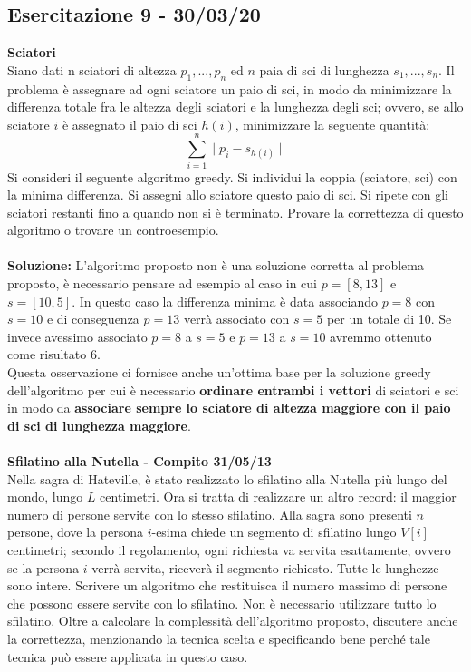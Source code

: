 \documentclass[../cheatSheetAlgoritmi.tex]{subfiles}
\begin{document}
\subsection{Esercitazione 9 - 30/03/20}
\textbf{Sciatori}\\
Siano dati n sciatori di altezza $p_{1}, ..., p_{n}$ ed $n$ paia di sci di lunghezza $s_{1}, ..., s_{n}$. Il problema è assegnare ad ogni sciatore un paio di sci, in modo da minimizzare la differenza totale fra le altezza degli sciatori e la lunghezza degli sci; ovvero, se allo sciatore $i$ è assegnato il paio di sci $h(i)$, minimizzare la seguente quantità:\\
\begin{equation}
	\sum_{i = 1}^{n}\mid{p_{i} - s_{h(i)}}\mid
\end{equation}
Si consideri il seguente algoritmo greedy. Si individui la coppia (sciatore, sci) con la minima differenza. Si assegni allo sciatore questo paio di sci. Si ripete con gli sciatori restanti fino a quando non si è terminato. Provare la correttezza di questo algoritmo o trovare un controesempio.\\\\
\textbf{Soluzione:} L'algoritmo proposto non è una soluzione corretta al problema proposto, è necessario pensare ad esempio al caso in cui $p = [8, 13]$ e $s = [10, 5]$. In questo caso la differenza minima è data associando $p = 8$ con $s = 10$ e di conseguenza $p = 13$ verrà associato con $s = 5$ per un totale di 10. Se invece avessimo associato $p = 8$ a $s = 5$ e $p = 13$ a $s = 10$ avremmo ottenuto come risultato 6.\\
Questa osservazione ci fornisce anche un'ottima base per la soluzione greedy dell'algoritmo per cui è necessario \textbf{ordinare entrambi i vettori} di sciatori e sci in modo da \textbf{associare sempre lo sciatore di altezza maggiore con il paio di sci di lunghezza maggiore}.\\\\  
\textbf{Sfilatino alla Nutella - Compito 31/05/13}\\
Nella sagra di Hateville, è stato realizzato lo sfilatino alla Nutella più lungo del mondo, lungo $L$ centimetri. Ora si tratta di realizzare un altro record: il maggior numero di persone servite con lo stesso sfilatino. Alla sagra sono presenti $n$ persone, dove la persona $i$-esima chiede un segmento di sfilatino lungo $V[i]$ centimetri; secondo il regolamento, ogni richiesta va servita esattamente, ovvero se la persona $i$ verrà servita, riceverà il segmento richiesto. Tutte le lunghezze sono intere. Scrivere un algoritmo che restituisca il numero massimo di persone che possono essere servite con lo sfilatino. Non è necessario utilizzare tutto lo sfilatino. Oltre a calcolare la complessità dell'algoritmo proposto, discutere anche la correttezza, menzionando la tecnica scelta e specificando bene perché tale tecnica può essere applicata in questo caso.
\end{document}
